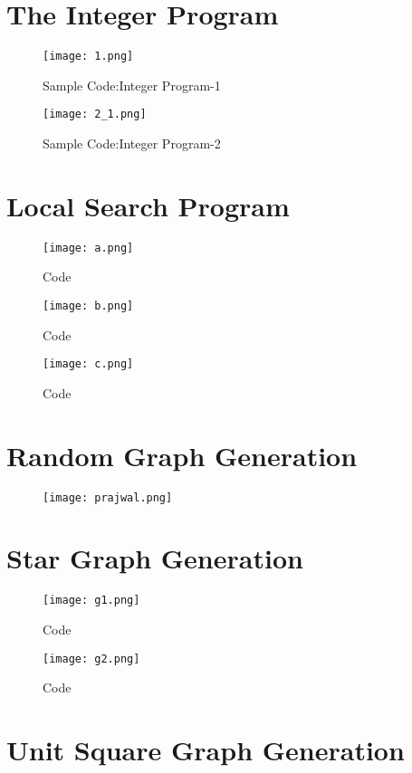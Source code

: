 \documentclass[12pt,a4paper,onecolumn]{article}
\begin{document}
\begin{appendices}
\section{The Integer Program}
\begin{center}

\begin{figure}[H]
 \texttt{[image: 1.png]}
  \caption{Sample Code:Integer Program-1}
  \label{Figure 2}
\end{figure}

\begin{figure}[H]
 \texttt{[image: 2\_1.png]}
  \caption{Sample Code:Integer Program-2}
  \label{Figure 3}
\end{figure}

\end{center}
\section{Local Search Program}
\begin{flushleft}
\begin{figure}[H]
 \texttt{[image: a.png]}
  \caption{Code}
  \label{Figure 4}
\end{figure}

\begin{figure}[H]
 \texttt{[image: b.png]}
  \caption{Code}
  \label{Figure 5}
\end{figure}

\begin{figure}[H]
 \texttt{[image: c.png]}
  \caption{Code}
  \label{Figure 6}
\end{figure}

\end{flushleft}
\section{Random Graph Generation}
\begin{figure}[H]
 \texttt{[image: prajwal.png]}
  \caption{ }
  \label{Figure 7}
\end{figure}
\section{Star Graph Generation}
\begin{figure}[H]
 \texttt{[image: g1.png]}
  \caption{Code}
  \label{Figure 8}
\end{figure}

\begin{figure}[H]
 \texttt{[image: g2.png]}
  \caption{Code}
  \label{Figure 9}
\end{figure}
\section{Unit Square Graph Generation}

\end{appendices}
\end{document}
